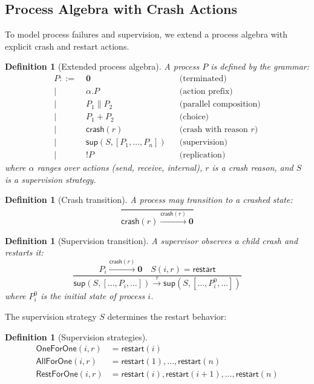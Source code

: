\documentclass[11pt,twocolumn]{article}
\newtheorem{definition}[theorem]{Definition}
\newcommand{\crash}{\mathsf{crash}}
\newcommand{\restart}{\mathsf{restart}}
\begin{document}
\subsection{Process Algebra with Crash Actions}

To model process failures and supervision, we extend a process algebra with explicit crash and restart actions.

\begin{definition}[Extended process algebra]
A process $P$ is defined by the grammar:
\begin{align*}
  P ::=\; & \mathbf{0} && \text{(terminated)} \\
  \mid\; & \alpha.P && \text{(action prefix)} \\
  \mid\; & P_1 \parallel P_2 && \text{(parallel composition)} \\
  \mid\; & P_1 + P_2 && \text{(choice)} \\
  \mid\; & \crash(r) && \text{(crash with reason } r\text{)} \\
  \mid\; & \mathsf{sup}(S, [P_1, \ldots, P_n]) && \text{(supervision)} \\
  \mid\; & !P && \text{(replication)}
\end{align*}
where $\alpha$ ranges over actions (send, receive, internal), $r$ is a crash reason, and $S$ is a supervision strategy.
\end{definition}

\begin{definition}[Crash transition]
A process may transition to a crashed state:
\[
  \frac{}{\crash(r) \xrightarrow{\crash(r)} \mathbf{0}}
\]
\end{definition}

\begin{definition}[Supervision transition]
A supervisor observes a child crash and restarts it:
\[
  \frac{P_i \xrightarrow{\crash(r)} \mathbf{0} \quad S(i, r) = \restart}
       {\mathsf{sup}(S, [\ldots, P_i, \ldots]) \xrightarrow{\tau} \mathsf{sup}(S, [\ldots, P_i^0, \ldots])}
\]
where $P_i^0$ is the initial state of process $i$.
\end{definition}

The supervision strategy $S$ determines the restart behavior:

\begin{definition}[Supervision strategies]
\begin{align*}
  \mathsf{OneForOne}(i, r) &= \restart(i) \\
  \mathsf{AllForOne}(i, r) &= \restart(1), \ldots, \restart(n) \\
  \mathsf{RestForOne}(i, r) &= \restart(i), \restart(i+1), \ldots, \restart(n)
\end{align*}
\end{definition}
\end{document}
